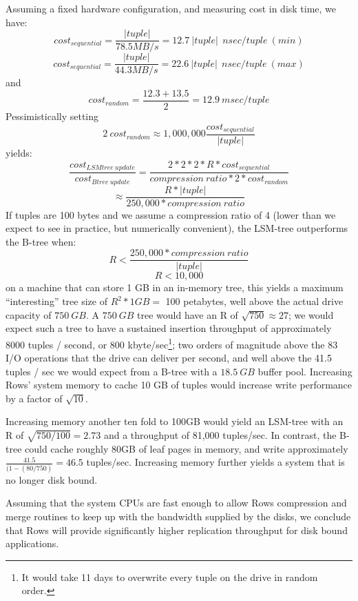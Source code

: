 \documentclass{sig-alternate-sigmod08}
\newcommand{\rows}{Rows\xspace}
\newcommand{\rowss}{Rows'\xspace}
\begin{document}
Assuming a fixed hardware configuration, and measuring cost in disk
time, we have:
\[
   cost_{sequential}=\frac{|tuple|}{78.5MB/s}=12.7~|tuple|~~nsec/tuple~(min)
\]
\[
   cost_{sequential}=\frac{|tuple|}{44.3MB/s}=22.6~|tuple|~~nsec/tuple~(max)
\]
and
\[
   cost_{random}=\frac{12.3+13.5}{2} = 12.9~msec/tuple
\]
Pessimistically setting
\[
2~cost_{random}\approx1,000,000\frac{cost_{sequential}}{|tuple|}
\] yields: \[
    \frac{cost_{LSMtree~update}}{cost_{Btree~update}}=\frac{2*2*2*R*cost_{sequential}}{compression~ratio*2*cost_{random}}
\]
\[
   \approx\frac{R*|tuple|}{250,000*compression~ratio}
\]
If tuples are 100 bytes and we assume a compression ratio of 4 (lower
than we expect to see in practice, but numerically convenient), the
LSM-tree outperforms the B-tree when:
\[
    R < \frac{250,000*compression~ratio}{|tuple|}
\]
\[
    R < 10,000
\]
on a machine that can store 1 GB in an in-memory tree, this yields a
maximum ``interesting'' tree size of $R^2*1GB = $ 100 petabytes, well
above the actual drive capacity of $750~GB$.  A $750~GB$ tree would
have an R of $\sqrt{750}\approx27$; we would expect such a tree to
have a sustained insertion throughput of approximately 8000 tuples /
second, or 800 kbyte/sec\footnote{It would take 11 days to overwrite
  every tuple on the drive in random order.}; two orders of magnitude
above the 83 I/O operations that the drive can deliver per second, and
well above the 41.5 tuples / sec we would expect from a B-tree with a
$18.5~GB$ buffer pool.  Increasing \rowss system memory to cache 10 GB of
tuples would increase write performance by a factor of $\sqrt{10}$.


Increasing memory another ten fold to 100GB would yield an LSM-tree
with an R of $\sqrt{750/100} = 2.73$ and a throughput of 81,000
tuples/sec.  In contrast, the B-tree could cache roughly 80GB of leaf pages
in memory, and write approximately $\frac{41.5}{(1-(80/750)} = 46.5$
tuples/sec.  Increasing memory further yields a system that
is no longer disk bound.

Assuming that the system CPUs are fast enough to allow \rows
compression and merge routines to keep up with the bandwidth supplied
by the disks, we conclude that \rows will provide significantly higher
replication throughput for disk bound applications.
\end{document}
